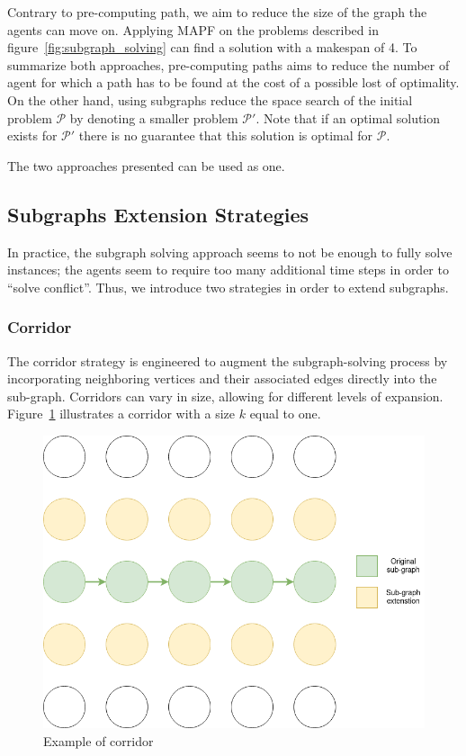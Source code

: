 Contrary to pre-computing path, we aim to reduce the size of the graph the agents can move on. Applying MAPF on the problems described in figure~\ref{fig:subgraph_solving} can find a solution with a makespan of 4. To summarize both approaches, pre-computing paths aims to reduce the number of agent for which a path has to be found at the cost of a possible lost of optimality. On the other hand, using subgraphs reduce the space search of the initial problem \(\mathcal{P}\) by denoting a smaller problem \(\mathcal{P}'\). Note that if an optimal solution exists for \(\mathcal{P}'\) there is no guarantee that this solution is optimal for \(\mathcal{P}\).

The two approaches presented can be used as one. 

\subsection{Subgraphs Extension Strategies}

In practice, the subgraph solving approach seems to not be enough to fully solve instances; the agents seem to require too many additional time steps in order to ``solve conflict''. Thus, we introduce two strategies in order to extend subgraphs. 

\subsubsection{Corridor}

The corridor strategy is engineered to augment the subgraph-solving process by incorporating neighboring vertices and their associated edges directly into the sub-graph. Corridors can vary in size, allowing for different levels of expansion. Figure~\ref{img:corridor} illustrates a corridor with a size \(k\) equal to one. 


\begin{figure}[H]
    \centering
    \caption{Example of corridor}\label{img:corridor}
    \includegraphics[width=\widthimg]{img/corridor.drawio.png}
\end{figure}

